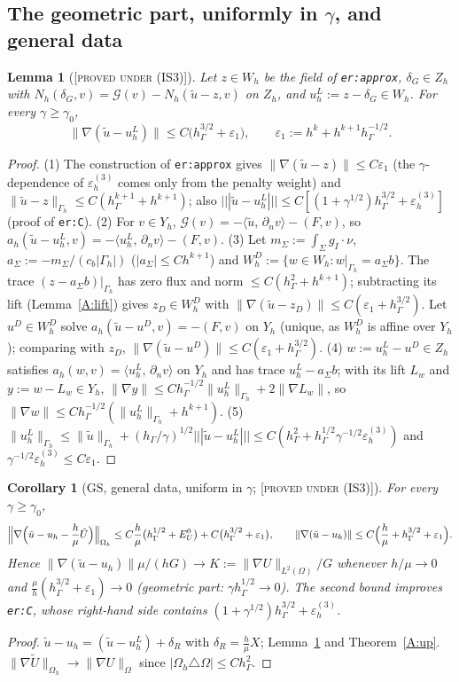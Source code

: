 \documentclass[11pt,reqno]{amsart}
\theoremstyle{plain}
\newtheorem{lemma}[theorem]{Lemma}
\newtheorem{corollary}[theorem]{Corollary}
\theoremstyle{definition}
\newcommand{\status}[1]{\textup{\textsc{[#1]}}}
\newcommand{\hG}{h_\Gamma}
\newcommand{\Gh}{\Gamma_h}
\newcommand{\Oh}{\Omega_h}
\newcommand{\Zh}{Z_h}
\newcommand{\Wh}{W_h}
\newcommand{\gI}{g_I}
\newcommand{\dn}{\partial_n}
\newcommand{\ut}{\tilde u}
\newcommand{\ip}[2]{\langle #1,\, #2\rangle}
\newcommand{\tnorm}[1]{|\!|\!|#1|\!|\!|}
\newcommand{\norm}[1]{\lVert #1\rVert}
\newcommand{\GS}{\mathrm{GS}}
\newcommand{\epsd}{\varepsilon_h^{(3)}}
\newcommand{\Gc}{\mathcal G}
\newcommand{\Ut}{\tilde U}
\newcommand{\Yh}{Y_h}
\begin{document}
\subsection{The geometric part, uniformly in $\gamma$, and general data}
\begin{lemma}[\status{proved under (IS3)}]\label{A:lin}
Let $z\in\Wh$ be the field of \texttt{er:approx}, $\delta_G\in\Zh$ with $N_h(\delta_G,v)=\Gc(v)-N_h(\ut-z,v)$ on $\Zh$, and $u^L_h:=z-\delta_G\in\Wh$. For every $\gamma\ge\gamma_0$,
\[
\norm{\nabla(\ut-u^L_h)}\le C\bigl(\hG^{3/2}+\varepsilon_1\bigr),\qquad\varepsilon_1:=h^k+h^{k+1}\hG^{-1/2}.
\]
\end{lemma}
\begin{proof}
(1) The construction of \texttt{er:approx} gives $\norm{\nabla(\ut-z)}\le C\varepsilon_1$ (the $\gamma$-dependence of $\epsd$ comes only from the penalty weight) and $\norm{\ut-z}_{\Gh}\le C(\hG^{k+1}+h^{k+1})$; also $\tnorm{\ut-u^L_h}\le C[(1+\gamma^{1/2})\hG^{3/2}+\epsd]$ (proof of \texttt{er:C}).
(2) For $v\in\Yh$, $\Gc(v)=-\ip\ut{\dn v}-(F,v)$, so $a_h(\ut-u^L_h,v)=-\ip{u^L_h}{\dn v}-(F,v)$.
(3) Let $m_\Sigma:=\int_\Sigma\gI\cdot\nu$, $a_\Sigma:=-m_\Sigma/(c_b|\Gh|)$ ($|a_\Sigma|\le Ch^{k+1}$) and $\Wh^D:=\{w\in\Wh:w|_{\Gh}=a_\Sigma b\}$. The trace $(z-a_\Sigma b)|_{\Gh}$ has zero flux and norm $\le C(\hG^2+h^{k+1})$; subtracting its lift (Lemma~\ref{A:lift}) gives $z_D\in\Wh^D$ with $\norm{\nabla(\ut-z_D)}\le C(\varepsilon_1+\hG^{3/2})$. Let $u^D\in\Wh^D$ solve $a_h(\ut-u^D,v)=-(F,v)$ on $\Yh$ (unique, as $\Wh^D$ is affine over $\Yh$); comparing with $z_D$, $\norm{\nabla(\ut-u^D)}\le C(\varepsilon_1+\hG^{3/2})$.
(4) $w:=u^L_h-u^D\in\Zh$ satisfies $a_h(w,v)=\ip{u^L_h}{\dn v}$ on $\Yh$ and has trace $u^L_h-a_\Sigma b$; with its lift $L_w$ and $y:=w-L_w\in\Yh$, $\norm{\nabla y}\le C\hG^{-1/2}\norm{u^L_h}_{\Gh}+2\norm{\nabla L_w}$, so $\norm{\nabla w}\le C\hG^{-1/2}(\norm{u^L_h}_{\Gh}+h^{k+1})$.
(5) $\norm{u^L_h}_{\Gh}\le\norm\ut_{\Gh}+(\hG/\gamma)^{1/2}\tnorm{\ut-u^L_h}\le C(\hG^2+\hG^{1/2}\gamma^{-1/2}\epsd)$ and $\gamma^{-1/2}\epsd\le C\varepsilon_1$.
\end{proof}

\begin{corollary}[$\GS$, general data, uniform in $\gamma$; \status{proved under (IS3)}]\label{A:gen}
For every $\gamma\ge\gamma_0$,
\[
\Bigl\|\nabla\Bigl(\ut-u_h-\frac h\mu\Ut\Bigr)\Bigr\|_{\Oh}\le C\frac h\mu\bigl(\hG^{1/2}+E^0_U\bigr)+C\bigl(\hG^{3/2}+\varepsilon_1\bigr),\qquad
\norm{\nabla(\ut-u_h)}\le C\Bigl(\frac h\mu+\hG^{3/2}+\varepsilon_1\Bigr).
\]
Hence $\norm{\nabla(\ut-u_h)}\mu/(hG)\to K:=\norm{\nabla U}_{L^2(\Omega)}/G$ whenever $h/\mu\to0$ and $\frac\mu h(\hG^{3/2}+\varepsilon_1)\to0$ (geometric part: $\gamma\hG^{1/2}\to0$). The second bound improves \texttt{er:C}, whose right-hand side contains $(1+\gamma^{1/2})\hG^{3/2}+\epsd$.
\end{corollary}
\begin{proof}
$\ut-u_h=(\ut-u^L_h)+\delta_R$ with $\delta_R=\frac h\mu X$; Lemma~\ref{A:lin} and Theorem~\ref{A:up}. $\norm{\nabla\Ut}_{\Oh}\to\norm{\nabla U}_\Omega$ since $|\Oh\triangle\Omega|\le C\hG^2$.
\end{proof}
\end{document}
